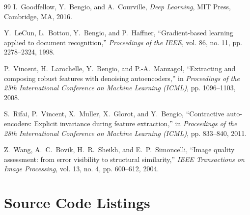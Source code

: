 \documentclass[12pt, a4paper]{article}
\begin{document}
\begin{thebibliography}{99}
I.~Goodfellow, Y.~Bengio, and A.~Courville, \textit{Deep Learning}, MIT Press, Cambridge, MA, 2016.

Y.~LeCun, L.~Bottou, Y.~Bengio, and P.~Haffner, ``Gradient-based learning applied to document recognition,'' \textit{Proceedings of the IEEE}, vol. 86, no. 11, pp. 2278--2324, 1998.

P.~Vincent, H.~Larochelle, Y.~Bengio, and P.-A.~Manzagol, ``Extracting and composing robust features with denoising autoencoders,'' in \textit{Proceedings of the 25th International Conference on Machine Learning (ICML)}, pp. 1096--1103, 2008.

S.~Rifai, P.~Vincent, X.~Muller, X.~Glorot, and Y.~Bengio, ``Contractive auto-encoders: Explicit invariance during feature extraction,'' in \textit{Proceedings of the 28th International Conference on Machine Learning (ICML)}, pp. 833--840, 2011.

Z.~Wang, A.~C.~Bovik, H.~R.~Sheikh, and E.~P.~Simoncelli, ``Image quality assessment: from error visibility to structural similarity,'' \textit{IEEE Transactions on Image Processing}, vol. 13, no. 4, pp. 600--612, 2004.
\end{thebibliography}

\newpage

\appendix
\section{Source Code Listings}
\end{document}
